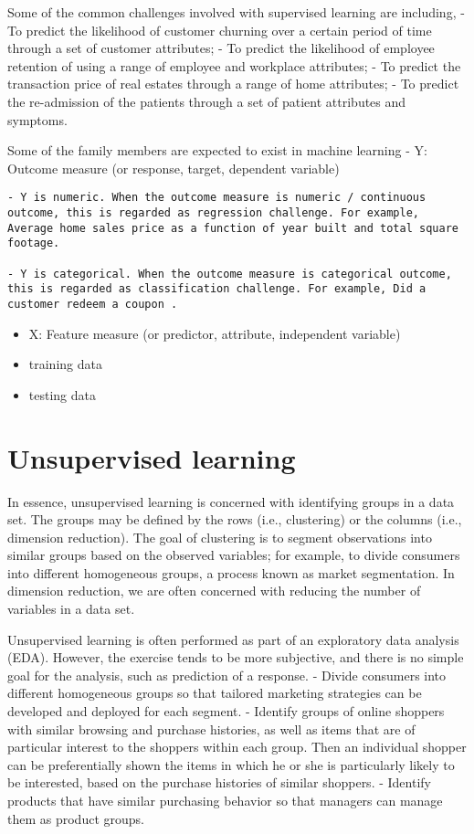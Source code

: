 \documentclass[]{book}
\providecommand{\tightlist}{%
  \setlength{\itemsep}{0pt}\setlength{\parskip}{0pt}}
\begin{document}
Some of the common challenges involved with supervised learning are including,
- To predict the likelihood of customer churning over a certain period of time through a set of customer attributes;
- To predict the likelihood of employee retention of using a range of employee and workplace attributes;
- To predict the transaction price of real estates through a range of home attributes;
- To predict the re-admission of the patients through a set of patient attributes and symptoms.

Some of the family members are expected to exist in machine learning
- Y: Outcome measure (or response, target, dependent variable)

\begin{verbatim}
- Y is numeric. When the outcome measure is numeric / continuous outcome, this is regarded as regression challenge. For example, Average home sales price as a function of year built and total square footage. 

- Y is categorical. When the outcome measure is categorical outcome, this is regarded as classification challenge. For example, Did a customer redeem a coupon . 
\end{verbatim}

\begin{itemize}
\tightlist
\item
  X: Feature measure (or predictor, attribute, independent variable)
\item
  training data
\item
  testing data
\end{itemize}

\hypertarget{unsupervised-learning}{%
\section{Unsupervised learning}\label{unsupervised-learning}}

In essence, unsupervised learning is concerned with identifying groups in a data set. The groups may be defined by the rows (i.e., clustering) or the columns (i.e., dimension reduction). The goal of clustering is to segment observations into similar groups based on the observed variables; for example, to divide consumers into different homogeneous groups, a process known as market segmentation. In dimension reduction, we are often concerned with reducing the number of variables in a data set.

Unsupervised learning is often performed as part of an exploratory data analysis (EDA). However, the exercise tends to be more subjective, and there is no simple goal for the analysis, such as prediction of a response.
- Divide consumers into different homogeneous groups so that tailored marketing strategies can be developed and deployed for each segment.
- Identify groups of online shoppers with similar browsing and purchase histories, as well as items that are of particular interest to the shoppers within each group. Then an individual shopper can be preferentially shown the items in which he or she is particularly likely to be interested, based on the purchase histories of similar shoppers.
- Identify products that have similar purchasing behavior so that managers can manage them as product groups.
\end{document}
